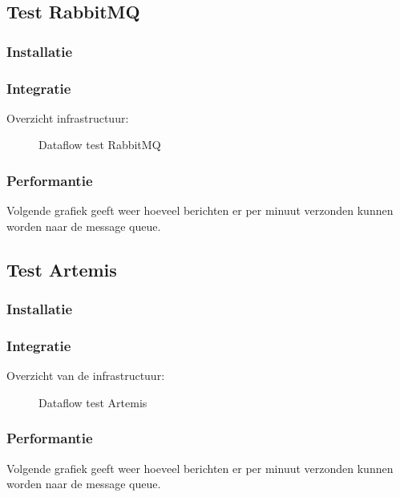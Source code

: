 \subsection{Test RabbitMQ}
\subsubsection{Installatie}
 
\subsubsection{Integratie}
 
Overzicht infrastructuur:
\begin{figure}[h!]
  \centering
  \caption{\label{fig:test_rabbitmq_dataflow}Dataflow test RabbitMQ}
\end{figure}

\subsubsection{Performantie}
Volgende grafiek geeft weer hoeveel berichten er per minuut verzonden kunnen worden naar de message queue.


\subsection{Test Artemis}

\subsubsection{Installatie}
 
\subsubsection{Integratie}

Overzicht van de infrastructuur:
\begin{figure}[h!]
  \centering
  \caption{\label{fig:test_artemis_dataflow}Dataflow test Artemis}
\end{figure}

\subsubsection{Performantie}
Volgende grafiek geeft weer hoeveel berichten er per minuut verzonden kunnen worden naar de message queue.









